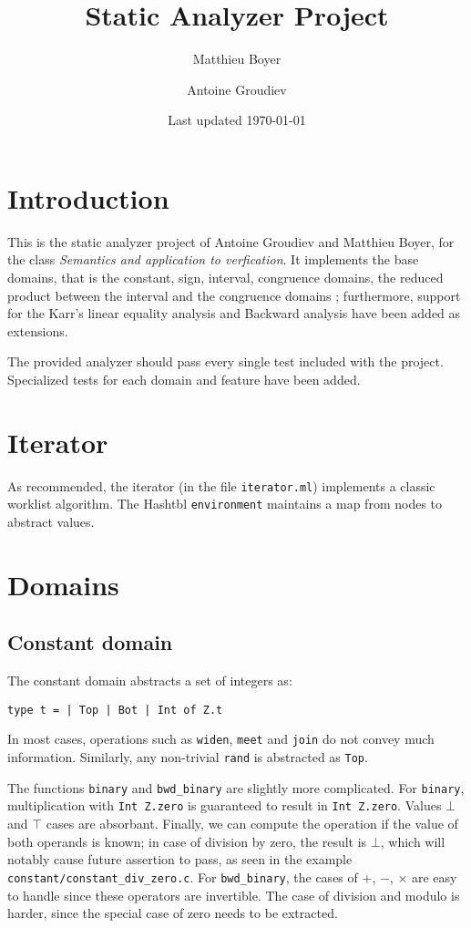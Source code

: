 \documentclass[12pt,a4paper]{article}
\title{\vspace{-5ex} \textbf{Static Analyzer Project}}
\author{Matthieu Boyer\and Antoine Groudiev}
\date{\vspace{-1ex}Last updated \today}
\begin{document}
\maketitle

\section*{Introduction}
This is the static analyzer project of Antoine Groudiev and Matthieu Boyer, for the class \emph{Semantics and application to verfication}. It implements the base domains, that is the constant, sign, interval, congruence domains, the reduced product between the interval and the congruence domains ; furthermore, support for the Karr’s linear equality analysis and Backward analysis have been added as extensions.

The provided analyzer should pass every single test included with the project. Specialized tests for each domain and feature have been added.

\section{Iterator}
As recommended, the iterator (in the file \texttt{iterator.ml}) implements a classic worklist algorithm. The Hashtbl \texttt{environment} maintains a map from nodes to abstract values.

\section{Domains}
\subsection{Constant domain}
The constant domain abstracts a set of integers as:
\begin{center}
    \texttt{type t = | Top | Bot | Int of Z.t}
\end{center}
In most cases, operations such as \texttt{widen}, \texttt{meet} and \texttt{join} do not convey much information. Similarly, any non-trivial \texttt{rand} is abstracted as \texttt{Top}.

The functions \texttt{binary} and \texttt{bwd\_binary} are slightly more complicated. For \texttt{binary}, multiplication with \texttt{Int Z.zero} is guaranteed to result in \texttt{Int Z.zero}. Values $\bot$ and $\top$ cases are absorbant. Finally, we can compute the operation if the value of both operands is known; in case of division by zero, the result is $\bot$, which will notably cause future assertion to pass, as seen in the example \texttt{constant/constant\_div\_zero.c}. For \texttt{bwd\_binary}, the cases of $+$, $-$, $\times$ are easy to handle since these operators are invertible. The case of division and modulo is harder, since the special case of zero needs to be extracted.
\end{document}
